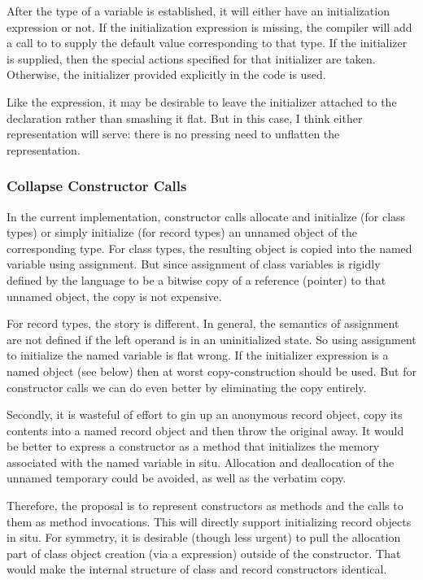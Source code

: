 After the type of a variable is established, it will either have an initialization
expression or not.  If the initialization expression is missing, the compiler will add a
call to  to supply the default value corresponding to that type.  If the
 initializer is supplied, then the special actions specified for
that initializer are taken.  Otherwise, the initializer provided explicitly in the code is
used.

Like the  expression, it may be desirable to leave the initializer attached
to the declaration rather than smashing it flat.  But in this case, I think either
representation will serve: there is no pressing need to unflatten the representation.

\subsubsection{Collapse Constructor Calls}

In the current implementation, constructor calls allocate and initialize (for class types)
or simply initialize (for record types) an unnamed object of the corresponding type.  
For class types, the resulting object is copied into the named variable using assignment.
But since assignment of class variables is rigidly defined by the language to be a bitwise
copy of a reference (pointer) to that unnamed object, the copy is not expensive.

For record types, the story is different.  In general, the semantics of assignment are not
defined if the left operand is in an uninitialized state.  So using assignment to
initialize the named variable is flat wrong.  If the initializer expression is a named
object (see below) then at worst copy-construction should be used.  But for constructor
calls we can do even better by eliminating the copy entirely.

Secondly, it is wasteful of effort to gin up
an anonymous record object, copy its contents into a named record object and then throw
the original away.  It would be better to express a constructor as a method that
initializes the memory associated with the named variable in situ.  Allocation and
deallocation of the unnamed temporary could be avoided, as well as the verbatim copy.

Therefore, the proposal is to represent constructors as methods and the calls to them as
method invocations.  This will directly support initializing record objects in situ.  For
symmetry, it is desirable (though less urgent) to pull the allocation part of class
object creation (via a  expression) outside of the constructor.  That would make
the internal structure of class and record constructors identical.  

